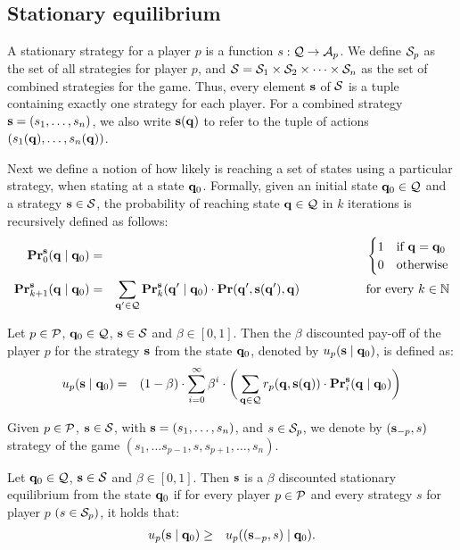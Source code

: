 \subsection{Stationary equilibrium}

A stationary strategy for a player $p$ is a function $s : \mathcal{Q} \rightarrow \mathcal{A}_p$. 
We define $\mathcal{S}_p$ as the set of all strategies for player $p$, and $\mathcal{S} = \mathcal{S}_{1} \times \mathcal{S}_{2} \times \cdots \times \mathcal{S}_{n}$ as the set of combined strategies for the game. Thus, every element $\mathbf{s}$ of $\mathcal{S}$ is a tuple containing exactly one strategy for each player. 
For a combined strategy $\mathbf{s} = (s_1, \ldots, s_n)$, 
we also write $\mathbf{s}(\mathbf{q})$ to refer to the tuple of actions $(s_1(\mathbf{q}), \ldots, s_n(\mathbf{q}))$. 

Next we define a notion of how likely is reaching a set of states using a particular strategy, when stating at a state $\mathbf{q}_0$. 
Formally, given an initial state $\mathbf{q}_0 \in \mathcal{Q}$ and a strategy $\mathbf{s} \in \mathcal{S}$, 
the probability of reaching state $\mathbf{q} \in \mathcal{Q}$ in $k$ iterations is recursively defined as follows:
\begin{eqnarray*}
\mathbf{Pr}_0^{\mathbf{s}}(\mathbf{q} \mid \mathbf{q}_0) & = &
\begin{cases}
1 & \text{if } \mathbf{q} = \mathbf{q}_0\\
0 & \text{otherwise}
\end{cases}\\
\mathbf{Pr}_{k+1}^{\mathbf{s}}(\mathbf{q} \mid \mathbf{q}_0) & = & \sum_{\mathbf{q}' \in \mathcal{Q}} \mathbf{Pr}_k^{\mathbf{s}}(\mathbf{q}'\mid \mathbf{q}_0) \cdot \mathbf{Pr}(\mathbf{q}', \mathbf{s}(\mathbf{q}'), \mathbf{q}) \quad \quad \quad  \quad \quad \text{ for every } k \in \mathbb{N}
\end{eqnarray*}


\begin{mydef}
Let $p \in \mathcal{P}$, $\mathbf{q}_0 \in \mathcal{Q}$, $\mathbf{s} \in \mathcal{S}$ and $\beta \in [0,1]$. Then the $\beta$ discounted pay-off of the player $p$ for the strategy $\mathbf{s}$ from the state $\mathbf{q}_0$, denoted by $u_p(\mathbf{s} \mid \mathbf{q}_0)$, is defined as:
\begin{eqnarray*}
u_p(\mathbf{s} \mid \mathbf{q}_0) & = & (1 - \beta) \cdot \sum_{i=0}^{\infty}\beta^{i} \cdot  \bigg(\sum_{\mathbf{q} \in \mathcal{Q}} r_p(\mathbf{q},\mathbf{s}(\mathbf{q})) \cdot 
\mathbf{Pr}_i^{\mathbf{s}}(\mathbf{q} \mid \mathbf{q}_0)\bigg)
\end{eqnarray*}
\end{mydef}
Given $p \in \mathcal{P}$, $\mathbf{s} \in \mathcal{S}$, with $\mathbf{s} = (s_1, \ldots, s_n)$, and $s \in \mathcal{S}_p$, we denote by $(\mathbf{s}_{-p}, s)$ strategy of the game $(s_1, \ldots s_{p-1},s,s_{p+1}, \ldots, s_{n})$.
\begin{mydef}
Let $\mathbf{q}_0 \in \mathcal{Q}$, $\mathbf{s} \in \mathcal{S}$ and $\beta \in [0,1]$. Then $\mathbf{s}$ is a $\beta$ discounted stationary equilibrium from the state $\mathbf{q}_0$ if for every player $p \in \mathcal{P}$ and every strategy $s$ for player $p$ $(s \in\mathcal{S}_p)$, it holds that:
\begin{eqnarray*}
u_p(\mathbf{s} \mid \mathbf{q}_0)  & \geq  & u_p ((\mathbf{s}_{-p},s) \mid \mathbf{q}_0).
\end{eqnarray*}
\end{mydef}

